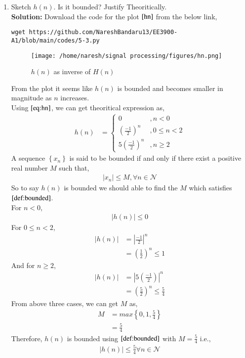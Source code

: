 \documentclass[journal,12pt,twocolumn]{IEEEtran}
\renewcommand\thesection{\arabic{section}}
\newcommand{\solution}{\noindent \textbf{Solution: }}
\providecommand{\brak}[1]{\ensuremath{\left(#1\right)}}
\providecommand{\cbrak}[1]{\ensuremath{\left\{#1\right\}}}
\providecommand{\abs}[1]{\left\vert#1\right\vert}
\numberwithin{equation}{section}
\renewcommand\thesection{\arabic{section}}
\begin{document}
\begin{enumerate}[label=\thesection.\arabic*]
    
\item Sketch $h(n)$. Is it bounded? Justify Theoritically.\\
    \solution  Download the code for the plot $\ref{hn}$ from the below link,
     \begin{lstlisting}
wget https://github.com/NareshBandaru13/EE3900-A1/blob/main/codes/5-3.py
     \end{lstlisting}
     \begin{figure}[ht!]
      \centering
      \texttt{[image: /home/naresh/signal processing/figures/hn.png]}
      \caption{$h\brak{n}$ as inverse of $H\brak{n}$}     
      \label{hn}
     \end{figure}
     From the plot it seems like $h(n)$ is bounded and becomes smaller in magnitude as $n$ increases.\\
    Using $\eqref{eq:hn}$, we can get theoritical expression as, 
     \begin{align}
       h\brak{n} &= \begin{cases}
                        0 &, n < 0\\
                        \brak{\frac{-1}{2}}^n &, 0\leq n<2\\
                        5\brak{\frac{-1}{2}}^n &, n \geq 2
                     \end{cases}\label{eq:hn_theo}
     \end{align}
    A sequence $\cbrak{x_n}$ is said to be bounded if and only if there exist a positive real number $M$ such that,
         \begin{align}
           \abs{x_n} \leq M , \forall n \in \mathcal{N}\label{def:bounded}
         \end{align}      
    So to say $h\brak{n}$ is bounded we should able to find the $M$ which satisfies $\eqref{def:bounded}$.\\
    For $n < 0$, 
       \begin{align}
    \abs{h\brak{n}} \leq 0 
       \end{align}
    For $0 \leq n <2$,
       \begin{align}
        \abs{h\brak{n}} &= \abs{\frac{-1}{2}}^{n}\\
                        &= \brak{\frac{1}{2}}^{n} \leq 1
       \end{align}
    And for $n \geq 2$,
       \begin{align}
        \abs{h\brak{n}} &= \abs{5\brak{\frac{-1}{2}}}^{n}\\
                        &= \brak{\frac{5}{2}}^{n} \leq \frac{5}{4}
       \end{align}
    From above three cases, we can get $M$ as,
      \begin{align}
        M &= max\cbrak{0,1,\frac{5}{4}} \\
          &= \frac{5}{4}
      \end{align}
    Therefore, $h\brak{n}$ is bounded using $\eqref{def:bounded}$ with $M = \frac{5}{4}$ i.e.,
    \begin{align} 
      \abs{h(n)} \leq \frac{5}{4}  \forall n \in \mathcal{N}
    \end{align}    
    

\end{enumerate}
\end{document}
